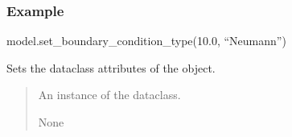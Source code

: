 \documentclass[a4paper,11pt,english,openany]{sphinxmanual}
\begin{document}
\begin{fulllineitems}
\begin{fulllineitems}
\begin{quote}
\begin{description}
\begin{itemize}
\end{itemize}

\end{description}\end{quote}
\subsubsection*{Example}

\sphinxAtStartPar
model.set\_boundary\_condition\_type(10.0, “Neumann”)

\end{fulllineitems}


\begin{fulllineitems}
\label{\detokenize{api/spyice.models.sea_ice_model:src.spyice.models.sea_ice_model.SeaIceModel.set_dataclass}}
\pysigstartsignatures
\pysiglinewithargsret
{}
{}
{}
\pysigstopsignatures
\sphinxAtStartPar
Sets the dataclass attributes of the object.
\begin{quote}\begin{description}
\sphinxAtStartPar
{} \textendash{} An instance of the dataclass.

\sphinxAtStartPar
None

\end{description}\end{quote}

\end{fulllineitems}



\end{fulllineitems}
\end{document}
